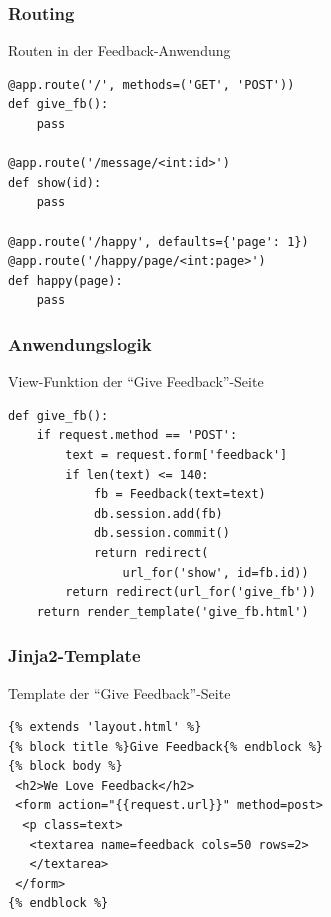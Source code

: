 \documentclass{beamer}
\begin{document}
\begin{frame}[fragile]
  \frametitle{Routing}
  \begin{exampleblock}{Routen in der Feedback-Anwendung}
    \begin{lstlisting}
@app.route('/', methods=('GET', 'POST'))
def give_fb():
    pass

@app.route('/message/<int:id>')
def show(id):
    pass

@app.route('/happy', defaults={'page': 1})
@app.route('/happy/page/<int:page>')
def happy(page):
    pass
    \end{lstlisting}
  \end{exampleblock}
\end{frame}

\begin{frame}[fragile]
  \frametitle{Anwendungslogik}
  \begin{exampleblock}{View-Funktion der \enquote{Give Feedback}-Seite}
    \begin{lstlisting}
def give_fb():
    if request.method == 'POST':
        text = request.form['feedback']
        if len(text) <= 140:
            fb = Feedback(text=text)
            db.session.add(fb)
            db.session.commit()
            return redirect(
                url_for('show', id=fb.id))
        return redirect(url_for('give_fb'))
    return render_template('give_fb.html')
    \end{lstlisting}
  \end{exampleblock}
\end{frame}

\begin{frame}[fragile]
  \frametitle{Jinja2-Template}
  \begin{exampleblock}{Template der \enquote{Give Feedback}-Seite}
    \begin{lstlisting}[syntax=HTML]
{% extends 'layout.html' %}
{% block title %}Give Feedback{% endblock %}
{% block body %}
 <h2>We Love Feedback</h2>
 <form action="{{request.url}}" method=post>
  <p class=text>
   <textarea name=feedback cols=50 rows=2>
   </textarea>
 </form>
{% endblock %}
    \end{lstlisting}
  \end{exampleblock}
\end{frame}
\end{document}
